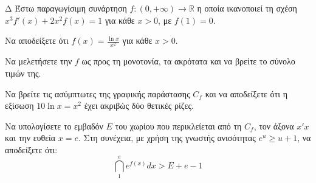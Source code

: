 \begin{thema}{Δ}
Έστω παραγωγίσιμη συνάρτηση $f:(0, +\infty) \to \mathbb{R}$ η οποία ικανοποιεί τη σχέση $x^3 f'(x) + 2x^2 f(x) = 1$ για κάθε $x > 0$, με $f(1) = 0$.
\begin{erwthma}
    \item Να αποδείξετε ότι $\displaystyle f(x) = \frac{\ln x}{x^2}$ για κάθε $x > 0$.
    \item Να μελετήσετε την $f$ ως προς τη μονοτονία, τα ακρότατα και να βρείτε το σύνολο τιμών της.
    \item Να βρείτε τις ασύμπτωτες της γραφικής παράστασης $C_f$ και να αποδείξετε ότι η εξίσωση $10 \ln x = x^2$ έχει ακριβώς δύο θετικές ρίζες.
    \item Να υπολογίσετε το εμβαδόν $E$ του χωρίου που περικλείεται από τη $C_f$, τον άξονα $x'x$ και την ευθεία $x = e$. Στη συνέχεια, με χρήση της γνωστής ανισότητας $e^u \ge u+1$, να αποδείξετε ότι:
    \[ \dint_1^e e^{f(x)} dx > E + e - 1 \]
\end{erwthma}
\end{thema}
